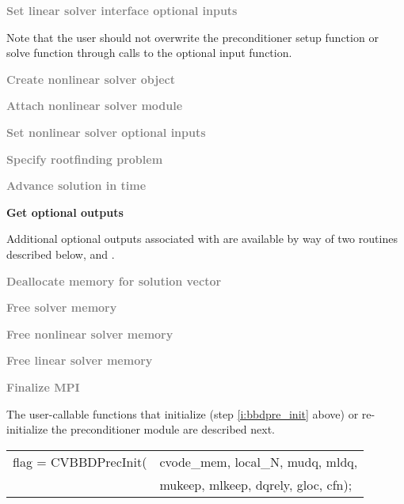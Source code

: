 \begin{Steps}
\item
  \textcolor{gray}{\bf Set linear solver interface optional inputs}

  Note that the user should not overwrite the preconditioner setup function
  or solve function through calls to the 
  optional input function.

\item
  \textcolor{gray}{\bf Create nonlinear solver object}

\item
  \textcolor{gray}{\bf Attach nonlinear solver module}

\item
  \textcolor{gray}{\bf Set nonlinear solver optional inputs}

\item
  \textcolor{gray}{\bf Specify rootfinding problem}

\item
  \textcolor{gray}{\bf Advance solution in time}

\item
  {\bf Get optional outputs}

  Additional optional outputs associated with {\cvbbdpre} are available by
  way of two routines described below,
   and .

\item
  \textcolor{gray}{\bf Deallocate memory for solution vector}

\item
  \textcolor{gray}{\bf Free solver memory}

\item
  \textcolor{gray}{\bf Free nonlinear solver memory}

\item
  \textcolor{gray}{\bf Free linear solver memory}

\item
  \textcolor{gray}{\bf Finalize MPI}

\end{Steps}
The user-callable functions that initialize (step \ref{i:bbdpre_init} above) or re-initialize
the {\cvbbdpre} preconditioner module are described next.
{
   \begin{tabular}[t]{@{}r@{}l@{}}
     flag = CVBBDPrecInit(&cvode\_mem, local\_N, mudq, mldq, \\
                          &mukeep, mlkeep, dqrely, gloc, cfn);
   \end{tabular}
}
